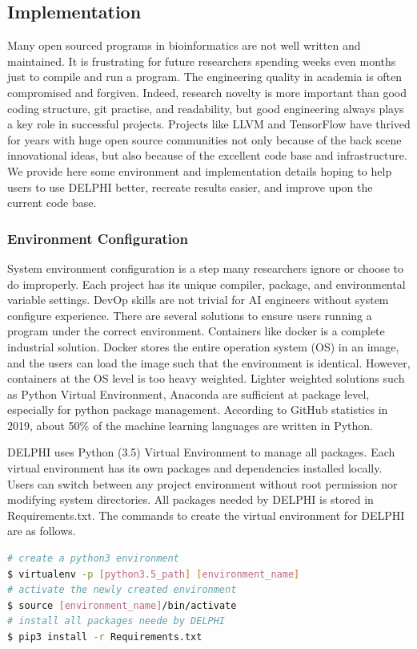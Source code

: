 \subsection{Implementation}
Many open sourced programs in bioinformatics are not well written and maintained. It is frustrating for future researchers spending weeks even months just to compile and run a program. The engineering quality in academia is often compromised and forgiven. Indeed, research novelty is more important than good coding structure, git practise, and readability, but good engineering always plays a key role in successful projects. Projects like LLVM \cite{lattner2004llvm} and TensorFlow \cite{tensorflow2015-whitepaper} have thrived for years with huge open source communities not only because of the back scene innovational ideas, but also because of the excellent code base and infrastructure. We provide here some environment and implementation details hoping to help users to use DELPHI better, recreate results easier, and improve upon the current code base.

\subsubsection{Environment Configuration}
System environment configuration is a step many researchers ignore or choose to do improperly. Each project has its unique compiler, package, and environmental variable settings. DevOp skills are not trivial for AI engineers without system configure experience. There are several solutions to ensure users running a program under the correct environment. Containers like docker is a complete industrial solution. Docker stores the entire operation system (OS) in an image, and the users can load the image such that the environment is identical. However, containers at the OS level is too heavy weighted. Lighter weighted solutions such as Python Virtual Environment, Anaconda are sufficient at package level, especially for python package management. According to GitHub statistics in 2019, about 50\% of the machine learning languages are written in Python.

DELPHI uses Python (3.5) Virtual Environment to manage all packages. Each virtual environment has its own packages and dependencies installed locally. Users can switch between any project environment without root permission nor modifying system directories. All packages needed by DELPHI is stored in Requirements.txt. The commands to create the virtual environment for DELPHI are as follows.
\begin{lstlisting}[language=bash,frame=single]
# create a python3 environment
$ virtualenv -p [python3.5_path] [environment_name] 
# activate the newly created environment
$ source [environment_name]/bin/activate 
# install all packages neede by DELPHI
$ pip3 install -r Requirements.txt 
\end{lstlisting}

